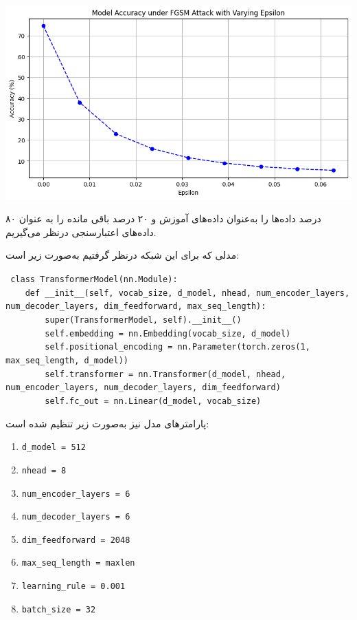 \begin{qsolve}
	\begin{center}
		\includegraphics*[width=1\linewidth]{pics/img7.png}
		\label{توکن‌های استرینگ شده}
	\end{center}
	
	۸۰ درصد داده‌ها را به‌عنوان داده‌های آموزش و ۲۰ درصد باقی مانده را به عنوان داده‌های اعتبارسنجی درنظر می‌گیریم.
	
	مدلی که برای این شبکه درنظر گرفتیم به‌صورت زیر است:
	\begin{latin}
		\texttt{%
			class TransformerModel(nn.Module):\\
			\ \ \ \ def \_\_init\_\_(self, vocab\_size, d\_model, nhead, num\_encoder\_layers, num\_decoder\_layers, dim\_feedforward, max\_seq\_length):\\
			\ \ \ \ \ \ \ \ super(TransformerModel, self).\_\_init\_\_()\\
			\ \ \ \ \ \ \ \ self.embedding = nn.Embedding(vocab\_size, d\_model)\\
			\ \ \ \ \ \ \ \ self.positional\_encoding = nn.Parameter(torch.zeros(1, max\_seq\_length, d\_model))\\
			\ \ \ \ \ \ \ \ self.transformer = nn.Transformer(d\_model, nhead, num\_encoder\_layers, num\_decoder\_layers, dim\_feedforward)\\
			\ \ \ \ \ \ \ \ self.fc\_out = nn.Linear(d\_model, vocab\_size)}
	\end{latin}
	
	
	
	پارامتر‌های مدل نیز به‌صورت زیر تنظیم شده است:
	
	\begin{latin}
		\begin{enumerate}
			\item \texttt{d\_model = 512}
			\item \texttt{nhead = 8}
			\item \texttt{num\_encoder\_layers = 6}
			\item \texttt{num\_decoder\_layers = 6}
			\item \texttt{dim\_feedforward = 2048}
			\item \texttt{max\_seq\_length = maxlen}
			\item \texttt{learning\_rule = 0.001}
			\item \texttt{batch\_size = 32}	
		\end{enumerate}
	\end{latin}
	

\end{qsolve}

